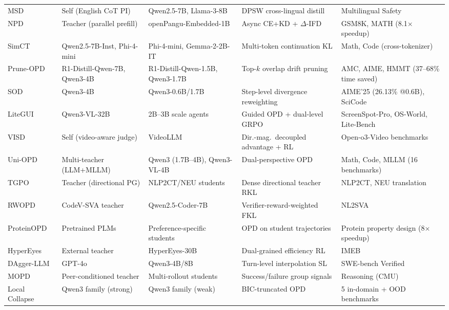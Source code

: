 \documentclass{article} %
\begin{document}
\begin{table}[t]
{\begin{tabular}{@{}lllll@{}}
        MSD~\citep{2605.02971} & Self (English CoT PI) & Qwen2.5-7B, Llama-3-8B & DPSW cross-lingual distill & Multilingual Safety \\
        NPD~\citep{2605.05940} & Teacher (parallel prefill) & openPangu-Embedded-1B & Async CE+KD + $\Delta$-IFD & GSM8K, MATH (8.1$\times$ speedup) \\
        SimCT~\citep{2605.07711} & Qwen2.5-7B-Inst, Phi-4-mini & Phi-4-mini, Gemma-2-2B-IT & Multi-token continuation KL & Math, Code (cross-tokenizer) \\
        Prune-OPD~\citep{2605.07804} & R1-Distill-Qwen-7B, Qwen3-4B & R1-Distill-Qwen-1.5B, Qwen3-1.7B & Top-$k$ overlap drift pruning & AMC, AIME, HMMT (37--68\% time saved) \\
        SOD~\citep{2605.07725} & Qwen3-4B & Qwen3-0.6B/1.7B & Step-level divergence reweighting & AIME'25 (26.13\% @0.6B), SciCode \\
        LiteGUI~\citep{2605.07505} & Qwen3-VL-32B & 2B--3B scale agents & Guided OPD + dual-level GRPO & ScreenSpot-Pro, OS-World, Lite-Bench \\
        VISD~\citep{2605.06094} & Self (video-aware judge) & VideoLLM & Dir.-mag.\ decoupled advantage + RL & Open-o3-Video benchmarks \\
        Uni-OPD~\citep{2605.03677} & Multi-teacher (LLM+MLLM) & Qwen3 (1.7B--4B), Qwen3-VL-4B & Dual-perspective OPD & Math, Code, MLLM (16 benchmarks) \\
        TGPO~\citep{2605.13230} & Teacher (directional PG) & NLP2CT/NEU students & Dense directional teacher RKL & NLP2CT, NEU translation \\
        RWOPD~\citep{2605.13501} & CodeV-SVA teacher & Qwen2.5-Coder-7B & Verifier-reward-weighted FKL & NL2SVA \\
        ProteinOPD~\citep{2605.10189} & Pretrained PLMs & Preference-specific students & OPD on student trajectories & Protein property design (8$\times$ speedup) \\
        HyperEyes~\citep{2605.07177} & External teacher & HyperEyes-30B & Dual-grained efficiency RL & IMEB \\
        DAgger-LLM~\citep{2605.12913} & GPT-4o & Qwen3-4B/8B & Turn-level interpolation SL & SWE-bench Verified \\
        MOPD~\citep{2605.12652} & Peer-conditioned teacher & Multi-rollout students & Success/failure group signals & Reasoning (CMU) \\
        Local Collapse~\citep{2605.13643} & Qwen3 family (strong) & Qwen3 family (weak) & BIC-truncated OPD & 5 in-domain + OOD benchmarks \\

\end{tabular}}
\end{table}
\end{document}
